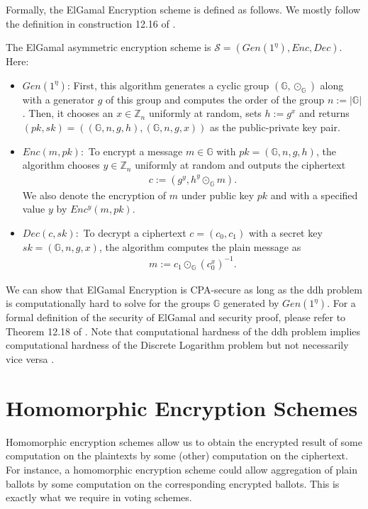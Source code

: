 Formally, the ElGamal Encryption scheme is defined as follows.
We mostly follow the definition in construction 12.16 of \cite{katz_introduction_2021}.

\newpage
\begin{definition}
    \label{def:elGamalEncryption}
    The ElGamal asymmetric encryption scheme is $\mathcal{S}=(Gen(1^\eta), Enc, Dec)$. Here:
    \begin{itemize}
        \item $Gen(1^\eta)$: First, this algorithm generates a cyclic group $(\mathbb{G}, \odot_{\mathbb{G}})$ along with a generator $g$ of this group and computes the order of the group $n:=|\mathbb{G}|$.
        Then, it chooses an $x\in\mathbb{Z}_n$ uniformly at random, sets $h:=g^x$ and returns $(pk, sk)=((\mathbb{G}, n, g, h), (\mathbb{G}, n, g, x))$ as the public-private key pair.
        \item $Enc(m, pk):$ To encrypt a message $m\in \mathbb{G}$ with $pk=(\mathbb{G}, n, g, h)$, the algorithm chooses $y\in\mathbb{Z}_n$ uniformly at random and outputs the ciphertext
        \begin{align*}
            c:=(g^y, h^y\odot_{\mathbb{G}} m)\text{.}
        \end{align*}
        We also denote the encryption of $m$ under public key $pk$ and with a specified value $y$ by $Enc^{y}(m, pk)$.
        \item $Dec(c, sk):$ To decrypt a ciphertext $c=(c_0, c_1)$ with a secret key $sk=(\mathbb{G}, n, g, x)$, the algorithm computes the plain message as \begin{align*}
            m:=c_1\odot_{\mathbb{G}} (c_0^x)^{-1}\text{.}
        \end{align*}
    \end{itemize}
\end{definition}

We can show that ElGamal Encryption is CPA-secure as long as the \gls{ddh} problem is computationally hard to solve for the groups $\mathbb{G}$ generated by $Gen(1^\eta)$.
For a formal definition of the security of ElGamal and security proof, please refer to Theorem 12.18 of \cite{katz_introduction_2021}.
Note that computational hardness of the \gls{ddh} problem implies computational hardness of the Discrete Logarithm problem but not necessarily vice versa \cite{least_authority_moonmath_2024}.

\section{Homomorphic Encryption Schemes}
Homomorphic encryption schemes allow us to obtain the encrypted result of some computation on the plaintexts by some (other) computation on the ciphertext.
For instance, a homomorphic encryption scheme could allow aggregation of plain ballots by some computation on the corresponding encrypted ballots. 
This is exactly what we require in voting schemes.

